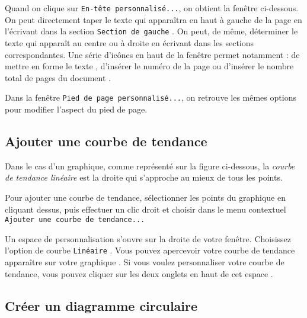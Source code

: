 Quand on clique sur \texttt{En-tête personnalisé...}, on obtient la fenêtre ci-dessous. On peut directement taper le texte qui apparaîtra en haut à gauche de la page en l'écrivant dans la section \texttt{Section de gauche} . On peut, de même, déterminer le texte qui apparaît au centre ou à droite en écrivant dans les sections correspondantes. Une série d'icônes en haut de la fenêtre permet notamment : de mettre en forme le texte , d'insérer le numéro de la page  ou d'insérer le nombre total de pages du document .



Dans la fenêtre \texttt{Pied de page personnalisé...}, on retrouve les mêmes options pour modifier l'aspect du pied de page.





\subsection{Ajouter une courbe de tendance}\label{Calc2CourbeTendance} 

Dans le cas d'un graphique, comme représenté sur la figure ci-dessous, la \emph{courbe de tendance linéaire} est la droite qui s'approche au mieux de tous les points. 



Pour ajouter une courbe de tendance, sélectionner les points du graphique en cliquant dessus, puis effectuer un clic droit et choisir dans le menu contextuel \texttt{Ajouter une courbe de tendance...}

%

Un espace de personnalisation s'ouvre sur la droite de votre fenêtre. Choisissez l'option de courbe \texttt{Linéaire} . Vous pouvez apercevoir votre courbe de tendance apparaître sur votre graphique . Si vous voulez personnaliser votre courbe de tendance, vous pouvez cliquer sur les deux onglets en haut de cet espace .



\subsection{Créer un diagramme circulaire}\label{Calc2DiagCirculaire}

